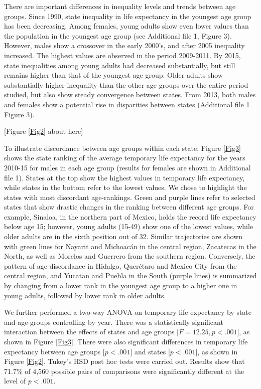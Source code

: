 \documentclass{bmcart}
\begin{document}
There are important differences in inequality levels and trends between age groups. Since 1990, state inequality in life expectancy in the youngest age group has been decreasing. Among females, young adults show even lower values than the population in the youngest age group (see Additional file 1, Figure 3). However, males show a crossover in the early 2000's, and after 2005 inequality increased. The highest values are observed in the period 2009-2011. By 2015, state inequalities among young adults had decreased substantially, but still remains higher than that of the youngest age group. Older adults show substantially higher inequality than the other age groups over the entire period studied, but also show steady convergence between states. From 2013, both males and females show a potential rise in disparities between states (Additional file 1 Figure 3).  \\

\begin{center}
[Figure \ref{Fig2} about here]
\end{center}


To illustrate discordance between age groups within each state, Figure \ref{Fig3} shows the state ranking of the average temporary life expectancy for the years 2010-15 for males in each age group (results for females are shown in Additional file 1). States at the top show the highest values in temporary life expectancy, while states in the bottom refer to the lowest values. We chose to highlight the states with most discordant age-rankings. Green and purple lines refer to selected states that show drastic changes in the ranking between different age groups. For example, Sinaloa, in the northern part of Mexico, holds the record life expectancy below age 15; however, young adults (15-49) show one of the lowest values, while older adults are in the sixth position out of 32. Similar trajectories are shown with green lines for Nayarit and Michoac\'an in the central region, Zacatecas in the North, as well as Morelos and Guerrero from the southern region. Conversely, the pattern of age discordance in Hidalgo, Quer\'etaro and Mexico City from the central region, and Yucatan and Puebla in the South (purple lines) is summarized by changing from a lower rank in the youngest age group to a higher one in young adults, followed by lower rank in older adults. 

We further performed a two-way ANOVA on temporary life expectancy by state and age-groups controlling by year. There was a statistically significant interaction between the effects of states and age groups [$F=12.25, p < .001$], as shown in Figure \ref{Fig3}. There were also significant differences in temporary life expectancy between age groups [$p < .001$] and states [$p < .001$], as shown in Figure \ref{Fig2}. Tukey's HSD post hoc tests were carried out. Results show that 71.7\% of 4,560 possible pairs of comparisons were significantly different at the level of $p < .001$. \\
\end{document}

